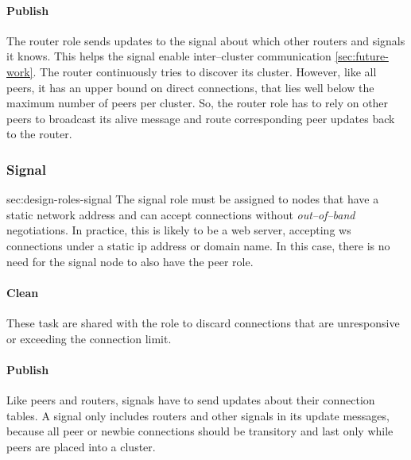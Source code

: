\paragraph{Publish}
\begin{itemize}
     The router role sends updates to the signal about which other routers and signals it knows. This helps the signal enable inter–cluster communication \cref{sec:future-work}.
     The router continuously tries to discover its cluster. However, like all peers, it has an upper bound on direct connections, that lies well below the maximum number of peers per cluster. So, the router role has to rely on other peers to broadcast its alive message and route corresponding peer updates back to the router.
\end{itemize}

\subsubsection{Signal}{sec:design-roles-signal}
The signal role must be assigned to nodes that have a static network address and can accept connections without \textit{out–of–band} negotiations. In practice, this is likely to be a web server, accepting \gls{ws} connections under a static \gls{ip} address or domain name. In this case, there is no need for the signal node to also have the peer role.

\paragraph{Clean}
\begin{itemize}
     These task are shared with the \peerRole role to discard connections that are unresponsive or exceeding the connection limit.
\end{itemize}

\paragraph{Publish}
\begin{itemize}
     Like peers and routers, signals have to send updates about their connection tables. A signal only includes routers and other signals in its update messages, because all peer or newbie connections should be transitory and last only while peers are placed into a cluster.
\end{itemize}

